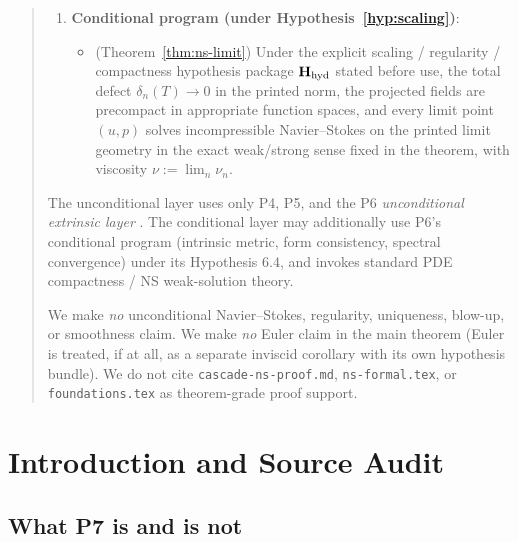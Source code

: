 \documentclass[11pt, a4paper]{amsart}
\theoremstyle{definition}
\begin{document}
\begin{abstract}
\begin{enumerate}
\item \textbf{Conditional program (under
  Hypothesis~\ref{hyp:scaling})}:
\begin{itemize}
\item[\textbf{T3}] (Theorem~\ref{thm:ns-limit}) Under the
  explicit scaling / regularity / compactness hypothesis package
  $\mathbf H_{\rm hyd}$ stated before use, the total defect
  $\delta_n(T) $ in the printed norm, the projected fields
  are precompact in appropriate function spaces, and every limit
  point $(u, p)$ solves incompressible Navier--Stokes on the
  printed limit geometry in the exact weak/strong sense fixed in
  the theorem, with viscosity $\nu := \lim_n \nu_n$.
\end{itemize}
\end{enumerate}

The unconditional layer uses only P4, P5, and the P6
\emph{unconditional extrinsic layer}
\cite[Thms.~4.2, 5.1, Prop.~6.1, Prop.~7.2]{SchlafliConvergence}.
The conditional layer may additionally use P6's conditional
program (intrinsic metric, form consistency, spectral
convergence) under its Hypothesis $6.4$, and invokes standard
PDE compactness / NS weak-solution theory.

We make \emph{no} unconditional Navier--Stokes, regularity,
uniqueness, blow-up, or smoothness claim. We make \emph{no}
Euler claim in the main theorem (Euler is treated, if at all,
as a separate inviscid corollary with its own hypothesis
bundle). We do not cite \texttt{cascade-ns-proof.md},
\texttt{ns-formal.tex}, or \texttt{foundations.tex} as
theorem-grade proof support.
\end{abstract}

\tableofcontents

\section{Introduction and Source Audit}
\label{sec:intro}

\subsection{What P7 is and is not}
\end{document}
